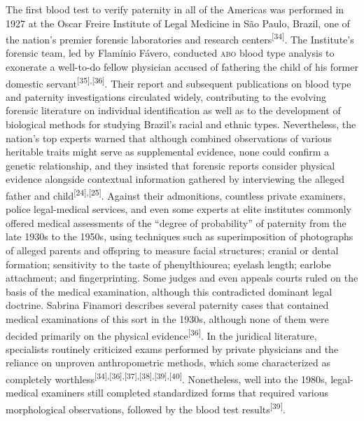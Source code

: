 \documentclass{article}
\begin{document}
The first blood test to verify paternity in all of the Americas was performed in
1927 at the Oscar Freire Institute of Legal Medicine in São Paulo, Brazil, one
of the nation’s premier forensic laboratories and research centers\textsuperscript{[}\textsuperscript{34}\textsuperscript{]}. The Institute’s forensic team, led by Flamínio Fávero, conducted \textsc{abo} blood
type analysis to exonerate a well-to-do fellow physician accused of fathering
the child of his former domestic servant\textsuperscript{[}\textsuperscript{35}\textsuperscript{]}\textsuperscript{,}\textsuperscript{[}\textsuperscript{36}\textsuperscript{]}. Their report and subsequent publications on blood type and paternity
investigations circulated widely, contributing to the evolving forensic
literature on individual identification as well as to the development of
biological methods for studying Brazil’s racial and ethnic types. Nevertheless,
the nation’s top experts warned that although combined observations of various
heritable traits might serve as supplemental evidence, none could confirm a
genetic relationship, and they insisted that forensic reports consider physical
evidence alongside contextual information gathered by interviewing the alleged
father and child\textsuperscript{[}\textsuperscript{24}\textsuperscript{]}\textsuperscript{,}\textsuperscript{[}\textsuperscript{25}\textsuperscript{]}. Against their admonitions, countless private examiners, police legal-medical
services, and even some experts at elite institutes commonly offered medical
assessments of the “degree of probability” of paternity from the late 1930s to
the 1950s, using techniques such as superimposition of photographs of alleged
parents and offspring to measure facial structures; cranial or dental formation;
sensitivity to the taste of phenylthiourea; eyelash length; earlobe attachment;
and fingerprinting. Some judges and even appeals courts ruled on the basis of
the medical examination, although this contradicted dominant legal doctrine.
Sabrina Finamori describes several paternity cases that contained medical
examinations of this sort in the 1930s, although none of them were decided
primarily on the physical evidence\textsuperscript{[}\textsuperscript{36}\textsuperscript{]}. In the juridical literature, specialists routinely criticized exams performed
by private physicians and the reliance on unproven anthropometric methods, which
some characterized as completely worthless\textsuperscript{[}\textsuperscript{34}\textsuperscript{]}\textsuperscript{,}\textsuperscript{[}\textsuperscript{36}\textsuperscript{]}\textsuperscript{,}\textsuperscript{[}\textsuperscript{37}\textsuperscript{]}\textsuperscript{,}\textsuperscript{[}\textsuperscript{38}\textsuperscript{]}\textsuperscript{,}\textsuperscript{[}\textsuperscript{39}\textsuperscript{]}\textsuperscript{,}\textsuperscript{[}\textsuperscript{40}\textsuperscript{]}. Nonetheless, well into the 1980s, legal-medical examiners still completed
standardized forms that required various morphological observations, followed by
the blood test results\textsuperscript{[}\textsuperscript{39}\textsuperscript{]}.
\end{document}
